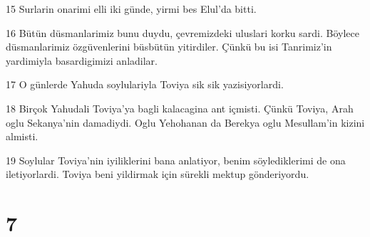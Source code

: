 \par 15 Surlarin onarimi elli iki günde, yirmi bes Elul'da bitti.
\par 16 Bütün düsmanlarimiz bunu duydu, çevremizdeki uluslari korku sardi. Böylece düsmanlarimiz özgüvenlerini büsbütün yitirdiler. Çünkü bu isi Tanrimiz'in yardimiyla basardigimizi anladilar.
\par 17 O günlerde Yahuda soylulariyla Toviya sik sik yazisiyorlardi.
\par 18 Birçok Yahudali Toviya'ya bagli kalacagina ant içmisti. Çünkü Toviya, Arah oglu Sekanya'nin damadiydi. Oglu Yehohanan da Berekya oglu Mesullam'in kizini almisti.
\par 19 Soylular Toviya'nin iyiliklerini bana anlatiyor, benim söylediklerimi de ona iletiyorlardi. Toviya beni yildirmak için sürekli mektup gönderiyordu.

\chapter{7}


